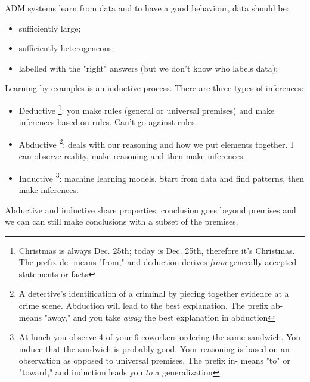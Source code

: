 ADM systems learn from data and to have a good behaviour, data should be:
\begin{itemize}
    \item sufficiently large;
    \item sufficiently heterogeneous;
    \item labelled with the "right" answers (but we don't know who labels data);
\end{itemize}
Learning by examples is an inductive process. There are three types of inferences:
\begin{itemize}
    \item Deductive \footnote{Christmas is always Dec. 25th; today is Dec. 25th, therefore it’s Christmas. The prefix de- means "from," and deduction derives \textit{from} generally accepted statements or facts}: you make rules (general or universal premises) and make inferences based on rules. Can't go against rules. 
    \item Abductive \footnote{A detective's identification of a criminal by piecing together evidence at a crime scene. Abduction will lead to the best explanation. The prefix ab- means "away," and you take \textit{away} the best explanation in abduction}: deals with our reasoning and how we put elements together. I can observe reality, make reasoning and then make inferences. 
    \item Inductive \footnote{At lunch you observe 4 of your 6 coworkers ordering the same sandwich. You induce that the sandwich is probably good. Your reasoning is based on an observation as opposed to universal premises. The prefix in- means "to" or "toward," and induction leads you \textit{to} a generalization}: machine learning models. Start from data and find patterns, then make inferences. 
\end{itemize}
Abductive and inductive share properties: conclusion goes beyond premises and we can can still make conclusions with a subset of the premises.

